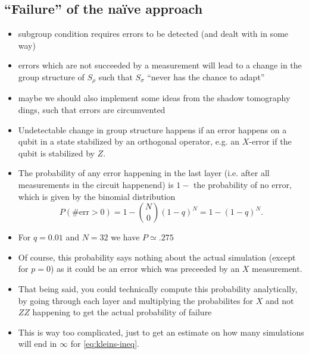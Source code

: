 \clearpage
\subsection{\enquote{Failure} of the na\"ive approach}
\begin{itemize}
  \item subgroup condition requires errors to be detected (and dealt with in
    some way)
  \item errors which are not succeeded by a measurement will lead to a change
    in the group structure of $S_\rho$ such that $S_\sigma$ \enquote{never has
    the chance to adapt}
  \item maybe we should also implement some ideas from the shadow tomography
    dings, such that errors are circumvented
  \item Undetectable change in group structure happens if an error happens on a
    qubit in a state stabilized by an orthogonal operator, e.g. an $X$-error if
    the qubit is stabilized by $Z$.
  \item The probability of any error happening in the last layer (i.e. after
    all measurements in the circuit happenend) is $1-$ the probability of no
    error, which is given by the binomial distribution
    \[ P(\#\mathrm{err}>0) = 1-\binom{N}{0} (1-q)^N=1-(1-q)^N. \]
  \item For $q=\num{0.01}$ and $N=32$ we have $P\simeq .275$
  \item Of course, this probability says nothing about the actual simulation
    (except for $p=0$) as it could be an error which was preceeded by an $X$
    measurement.
  \item That being said, you could technically compute this probability
    analytically, by going through each layer and multiplying the probabilites
    for \(X\) and not $ZZ$ happening to get the actual probability of failure
   \item This is way too complicated, just to get an estimate on how many
     simulations will end in $\infty$ for \cref{eq:kleins-ineq}. 
\end{itemize}
\clearpage
